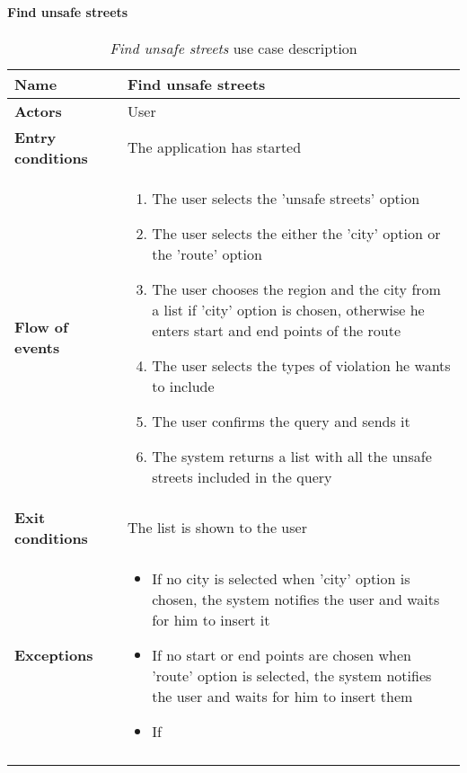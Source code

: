 		\paragraph{Find unsafe streets}
		\begin{longtable}{p{0.25\linewidth}p{0.75\linewidth}}
			\toprule
			\textbf{Name} & \textbf{Find unsafe streets} \\
			\midrule
			\textbf{Actors} & User \\
			\midrule
			\textbf{Entry conditions} & The application has started \\
			\midrule
			\textbf{Flow of events} & 
			\begin{enumerate}
				\item The user selects the 'unsafe streets' option
				\item The user selects the either the 'city' option or the 'route' option
				\item The user chooses the region and the city from a list if 'city' option is chosen, otherwise he enters start and end points of the route
				\item The user selects the types of violation he wants to include
				\item The user confirms the query and sends it
				\item The system returns a list with all the unsafe streets included in the query
			\end{enumerate} \\
			\midrule
			\textbf{Exit conditions} & The list is shown to the user\\
			\midrule
			\textbf{Exceptions} & 
			\begin{itemize}
				\item If no city is selected when 'city' option is chosen, the system notifies the user and waits for him to insert it
				\item If no start or end points are chosen when 'route' option is selected, the system notifies the user and waits for him to insert them
				\item If
			\end{itemize} \\
			\bottomrule
			\caption{\emph{Find unsafe streets} use case description}
		\end{longtable}
		
